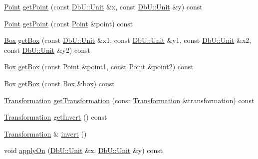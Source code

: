 \begin{DoxyCompactItemize}
\item 
\hyperlink{classHurricane_1_1Point}{Point} \hyperlink{classHurricane_1_1Transformation_afcbf89713c2dcc6c9fe833ce25e9bae8}{get\-Point} (const \hyperlink{group__DbUGroup_ga4fbfa3e8c89347af76c9628ea06c4146}{Db\-U\-::\-Unit} \&x, const \hyperlink{group__DbUGroup_ga4fbfa3e8c89347af76c9628ea06c4146}{Db\-U\-::\-Unit} \&y) const 
\item 
\hyperlink{classHurricane_1_1Point}{Point} \hyperlink{classHurricane_1_1Transformation_afe6e0136021b51e5f967ac8483adf02c}{get\-Point} (const \hyperlink{classHurricane_1_1Point}{Point} \&point) const 
\item 
\hyperlink{classHurricane_1_1Box}{Box} \hyperlink{classHurricane_1_1Transformation_a622d2d812f0f6a28bd3ed5df992ee3f1}{get\-Box} (const \hyperlink{group__DbUGroup_ga4fbfa3e8c89347af76c9628ea06c4146}{Db\-U\-::\-Unit} \&x1, const \hyperlink{group__DbUGroup_ga4fbfa3e8c89347af76c9628ea06c4146}{Db\-U\-::\-Unit} \&y1, const \hyperlink{group__DbUGroup_ga4fbfa3e8c89347af76c9628ea06c4146}{Db\-U\-::\-Unit} \&x2, const \hyperlink{group__DbUGroup_ga4fbfa3e8c89347af76c9628ea06c4146}{Db\-U\-::\-Unit} \&y2) const 
\item 
\hyperlink{classHurricane_1_1Box}{Box} \hyperlink{classHurricane_1_1Transformation_adbc959384e9b98bfd8d883f631ad2db6}{get\-Box} (const \hyperlink{classHurricane_1_1Point}{Point} \&point1, const \hyperlink{classHurricane_1_1Point}{Point} \&point2) const 
\item 
\hyperlink{classHurricane_1_1Box}{Box} \hyperlink{classHurricane_1_1Transformation_adf1b977f40037dbc595e47a1b6aa82bb}{get\-Box} (const \hyperlink{classHurricane_1_1Box}{Box} \&box) const 
\item 
\hyperlink{classHurricane_1_1Transformation}{Transformation} \hyperlink{classHurricane_1_1Transformation_acb0322fd23ef4cbc5c0f0098326a42c2}{get\-Transformation} (const \hyperlink{classHurricane_1_1Transformation}{Transformation} \&transformation) const 
\item 
\hyperlink{classHurricane_1_1Transformation}{Transformation} \hyperlink{classHurricane_1_1Transformation_abd669a1336264adfc17a587f75bdd7ee}{get\-Invert} () const 
\item 
\hyperlink{classHurricane_1_1Transformation}{Transformation} \& \hyperlink{classHurricane_1_1Transformation_a4d49d9fde0fe04eba9e8f0c7360f2c79}{invert} ()
\item 
void \hyperlink{classHurricane_1_1Transformation_a7525d2b791e83b77c20d61fbdff0d72e}{apply\-On} (\hyperlink{group__DbUGroup_ga4fbfa3e8c89347af76c9628ea06c4146}{Db\-U\-::\-Unit} \&x, \hyperlink{group__DbUGroup_ga4fbfa3e8c89347af76c9628ea06c4146}{Db\-U\-::\-Unit} \&y) const 

\end{DoxyCompactItemize}
